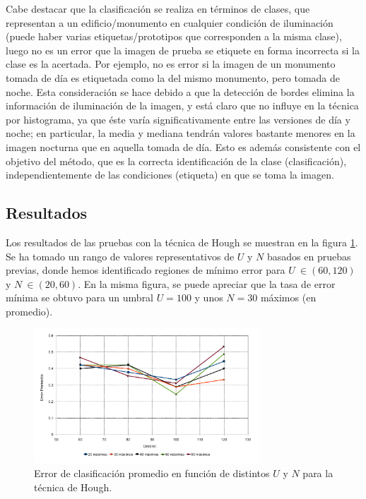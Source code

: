 \documentclass[conference,a4paper,10pt,oneside,final]{tfmpd}
\begin{document}
Cabe destacar que la clasificación se realiza en términos de clases, que
representan a un edificio/monumento en cualquier condición de iluminación
(puede haber varias etiquetas/prototipos que corresponden a la misma clase),
luego no es un error que la imagen de prueba se etiquete en forma incorrecta
si la clase es la acertada.
Por ejemplo, no es error si la imagen de un monumento tomada de día es
etiquetada como la del mismo monumento, pero tomada de noche.
Esta consideración se hace debido a que la detección de bordes elimina la
información de iluminación de la imagen, y está claro que no influye
en la técnica por histograma, ya que éste varía significativamente
entre las versiones de día y noche; en particular, la media y mediana tendrán
valores bastante menores en la imagen nocturna que en aquella tomada de día.
Esto es además consistente con el objetivo del método, que es la correcta
identificación de la clase (clasificación), independientemente de las
condiciones (etiqueta) en que se toma la imagen.
%
%
\subsection*{Resultados}
Los resultados de las pruebas con {la técnica} de Hough se muestran en la figura
\ref{graficaerror}. Se ha tomado un rango de valores representativos de $U$
y $N$ basados en pruebas previas, donde hemos identificado regiones de mínimo
error para $U~\in(60,120)$ y $N~\in(20,60)$.
En la misma figura, se puede apreciar que la tasa de error mínima se obtuvo
para un umbral $U = 100$ y unos $N = 30$ máximos (en promedio).

\begin{figure}
\begin{center}
\includegraphics[width=8.5cm]{../diagramas/estadistica_noche_iguales}
\end{center}
\caption{Error de clasificación promedio en función de distintos $U$ y $N$ para
{la técnica} de Hough.}
\label{graficaerror}
\end{figure}
\end{document}
